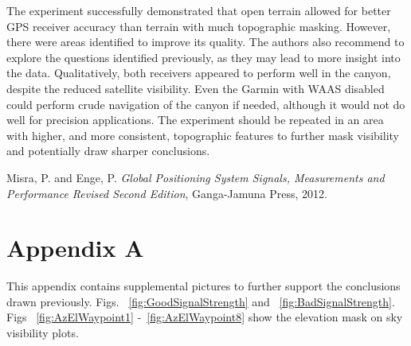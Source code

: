 \documentclass[]{aiaa-tc}%
\begin{document}
	\vspace{5 mm}
	
	\noindent The experiment successfully demonstrated that open terrain allowed for better GPS receiver accuracy than terrain with much topographic masking. However, there were areas identified to improve its quality. The authors also recommend to explore the questions identified previously, as they may lead to more insight into the data. Qualitatively, both receivers appeared to perform well in the canyon, despite the reduced satellite visibility. Even the Garmin with WAAS disabled could perform crude navigation of the canyon if needed, although it would not do well for precision applications. The experiment should be repeated in an area with higher, and more consistent, topographic features to further mask visibility and potentially draw sharper conclusions.
	
	
	\begin{thebibliography}{9}%
		\noindent Misra, P. and Enge, P. \emph{Global Positioning System Signals, Measurements and Performance Revised Second Edition}, Ganga-Jamuna Press, 2012.
		
		
	\end{thebibliography}
	
	\newpage

	\section{Appendix A}
	\noindent This appendix contains supplemental pictures to further support the conclusions drawn previously.  Figs. ~\ref{fig:GoodSignalStrength} and ~\ref{fig:BadSignalStrength}. Figs ~\ref{fig:AzElWaypoint1} -~\ref{fig:AzElWaypoint8} show the elevation mask on sky visibility plots.
	
\end{document}
